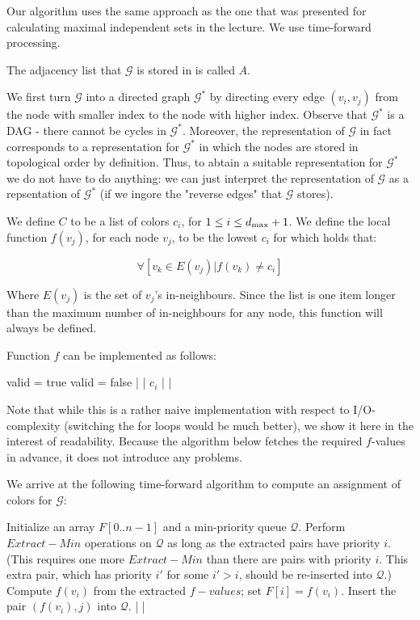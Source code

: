 Our algorithm uses the same approach as the one that was presented for calculating maximal independent sets in the lecture.
We use time-forward processing.

The adjacency list that $\mathcal{G}$ is stored in is called $A$.

We first turn $\mathcal{G}$ into a directed graph $\mathcal{G}^*$ by directing every edge $(v_i, v_j)$ from the node with smaller index to the node with higher index.
Observe that $\mathcal{G}^*$ is a DAG - there cannot be cycles in $\mathcal{G}^*$.
Moreover, the representation of $\mathcal{G}$ in fact corresponds to a representation for $\mathcal{G}^*$ in which the nodes are stored in topological order by definition.
Thus, to abtain a suitable representation for $\mathcal{G}^*$ we do not have to do anything: we can just interpret the representation of $\mathcal{G}$ as a repsentation of $\mathcal{G}^*$ (if we ingore the "reverse edges" that $\mathcal{G}$ stores).

We define $C$ to be a list of colors $c_i$, for $1 \leq i \leq d_{\textnormal{max}} + 1$.
We define the local function $f(v_j)$, for each node $v_j$, to be the lowest $c_i$ for which holds that:

\[
	\forall\left[v_k \in E(v_j) | f(v_k) \not= c_i\right]
\]

Where $E(v_j)$ is the set of $v_j$'s in-neighbours.
Since the list is one item longer than the maximum number of in-neighbours for any node, this function will always be defined.

Function $f$ can be implemented as follows:

\begin{sourcecode}
	valid = true
			valid = false
		|
	|
		\return $c_i$
	|
|
\qend
\end{sourcecode}

Note that while this is a rather naive implementation with respect to I/O-complexity (switching the for loops would be much better), we show it here in the interest of readability.
Because the algorithm below fetches the required $f$-values in advance, it does not introduce any problems.

We arrive at the following time-forward algorithm to compute an assignment of colors for $\mathcal{G}$:

\begin{sourcecode}
Initialize an array $F[0..n-1]$ and a min-priority queue $\mathcal{Q}$.
	Perform $Extract-Min$ operations on $\mathcal{Q}$ as long as the extracted pairs have priority $i$. (This requires one more $Extract-Min$ than there are pairs with priority $i$. This extra pair, which has priority $i'$ for some $i' > i$, should be re-inserted into $\mathcal{Q}$.)
	Compute $f(v_i)$ from the extracted $f-values$; set $F[i] = f(v_i)$.
		Insert the pair $(f(v_i), j)$ into $\mathcal{Q}$.
	|
|
\qend
\end{sourcecode}

